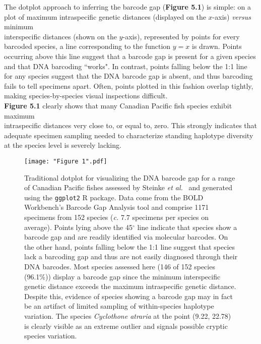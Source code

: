 The dotplot approach to inferring the barcode gap (\textbf{Figure 5.1}) is simple: on a plot of maximum intraspecific genetic distances (displayed on the $x$-axis) \textit{versus} minimum \\ interspecific distances (shown on the $y$-axis), represented by points for every barcoded species, a line corresponding to the function $y=x$ is drawn. Points occurring above this line suggest that a barcode gap is present for a given species and that DNA barcoding ``works". In contrast, points falling below the 1:1 line for any species suggest that the DNA barcode gap is absent, and thus barcoding fails to tell specimens apart. Often, points plotted in this fashion overlap tightly, making species-by-species visual inspections difficult. \\ \textbf{Figure 5.1} clearly shows that many Canadian Pacific fish species exhibit maximum 
\\ intraspecific distances very close to, or equal to, zero. This strongly indicates that adequate specimen sampling needed to characterize standing haplotype diversity at the species level is severely lacking.

\begin{figure}[H]

\centering

\texttt{[image: "Figure 1".pdf]}

\caption[Depiction of the DNA barcode gap as a traditional dotpot for Canadian Pacific fishes assessed by Steinke \textit{et al.}~ \cite{steinke2009dna}.]{Traditional dotplot for visualizing the DNA barcode gap for a range of Canadian Pacific fishes assessed by Steinke \textit{et al.}~\cite{steinke2009dna} and generated using the {\tt ggplot2} \cite{wickham2016ggplot2} R package. Data come from the BOLD Workbench's Barcode Gap Analysis tool and comprise 1171 specimens from 152 species (\textit{c.} 7.7 specimens per species on average). Points lying above the 45$^{\circ}$ line indicate that species show a barcode gap and are readily identified via molecular barcodes. On the other hand, points falling below the 1:1 line suggest that species lack a barcoding gap and thus are not easily diagnosed through their DNA barcodes. Most species assessed here (146 of 152 species (96.1\%)) display a barcode gap since the minimum interspecific genetic distance exceeds the maximum intraspecific genetic distance. Despite this, evidence of species showing a barcode gap may in fact be an artifact of limited sampling of within-species haplotype variation. The species \textit{Cyclothone atraria} at the point (9.22, 22.78) is clearly visible as an extreme outlier and signals possible cryptic species variation.}
\end{figure}



